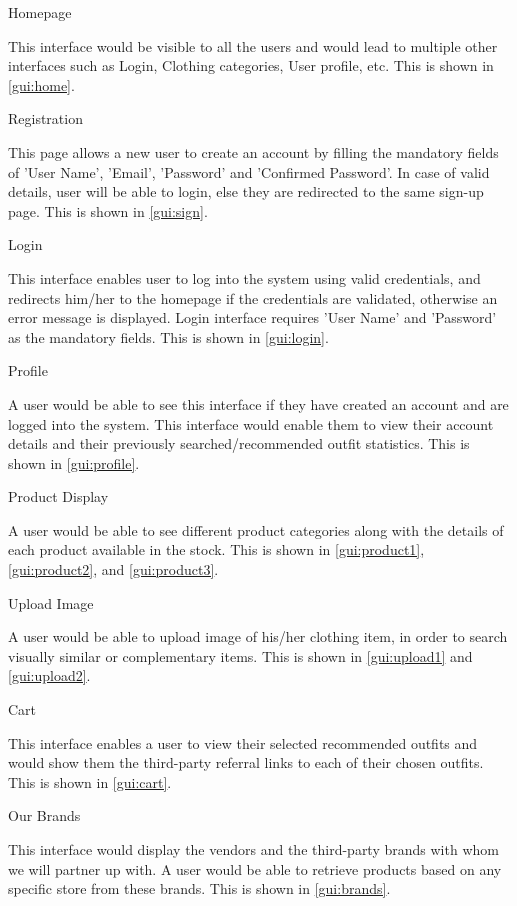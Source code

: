 \FloatBarrier
\begin{outline}
  \1 Homepage
  
  This interface would be visible to all the users and would lead to multiple other interfaces such as Login, Clothing categories, User profile, etc. This is shown in \autoref{gui:home}.


    
  \1 Registration
  
  This page allows a new user to create an account by filling the mandatory fields of 'User Name', 'Email', 'Password' and 'Confirmed Password'. In case of valid details, user will be able to login, else they are redirected to the same sign-up page. This is shown in \autoref{gui:sign}.


    
  \1 Login
  
  This interface enables user to log into the system using valid credentials, and redirects him/her to the homepage if the credentials are validated, otherwise an error message is displayed. Login interface requires 'User Name' and 'Password' as the mandatory fields. This is shown in \autoref{gui:login}.


  \1 Profile
  
  A user would be able to see this interface if they have created an account and are logged into the system. This interface would enable them to view their account details and their previously searched/recommended outfit statistics. This is shown in \autoref{gui:profile}.


  \1 Product Display
  
  A user would be able to see different product categories along with the details of each product available in the stock. This is shown in \autoref{gui:product1}, \autoref{gui:product2}, and \autoref{gui:product3}.
  

  
  
  \1 Upload Image
  
  A user would be able to upload image of his/her clothing item, in order to search visually similar or complementary items. This is shown in \autoref{gui:upload1} and \autoref{gui:upload2}.
  


  \1 Cart
  
  This interface enables a user to view their selected recommended outfits and would show them the third-party referral links to each of their chosen outfits. This is shown in \autoref{gui:cart}.
  

  \1 Our Brands

  This interface would display the vendors and the third-party brands with whom we will partner up with. A user would be able to retrieve products based on any specific store from these brands. This is shown in \autoref{gui:brands}. 
  
 \end{outline}
 
